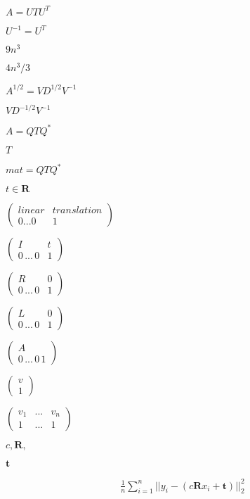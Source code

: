 \documentclass{article}
\begin{document}
$ A = U T U^T $
\pagebreak

$ U^{-1} = U^T $
\pagebreak

$ 9n^3 $
\pagebreak

$ 4n^3/3 $
\pagebreak

$ A^{1/2} = V D^{1/2} V^{-1} $
\pagebreak

$ V D^{-1/2} V^{-1} $
\pagebreak

$ A = Q T Q^* $
\pagebreak

$ T $
\pagebreak

$ mat = Q T Q^* $
\pagebreak

$ t \in \mathbf{R} $
\pagebreak

$ \left( \begin{array}{cc} linear & translation\\ 0 ... 0 & 1 \end{array} \right) $
\pagebreak

$ \left( \begin{array}{cc} I & t \\ 0\,...\,0 & 1 \end{array} \right) $
\pagebreak

$ \left( \begin{array}{cc} R & 0\\ 0\,...\,0 & 1 \end{array} \right) $
\pagebreak

$ \left( \begin{array}{cc} L & 0\\ 0\,...\,0 & 1 \end{array} \right) $
\pagebreak

$ \left( \begin{array}{c} A\\ 0\,...\,0\,1 \end{array} \right) $
\pagebreak

$ \left( \begin{array}{c} v\\ 1 \end{array} \right) $
\pagebreak

$ \left( \begin{array}{ccc} v_1 & ... & v_n\\ 1 & ... & 1 \end{array} \right) $
\pagebreak

$ c, \mathbf{R}, $
\pagebreak

$ \mathbf{t} $
\pagebreak

\begin{align*} \frac{1}{n} \sum_{i=1}^n \vert\vert y_i - (c\mathbf{R}x_i + \mathbf{t}) \vert\vert_2^2 \end{align*}
\pagebreak
\end{document}
